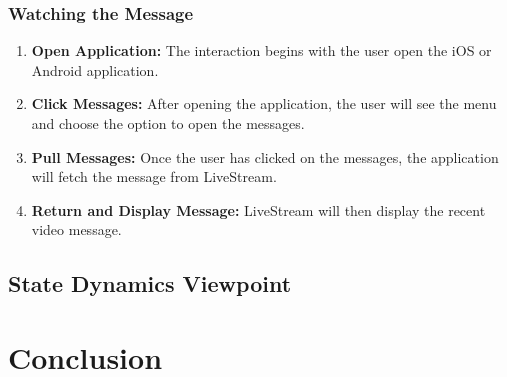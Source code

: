 \documentclass[letterpaper,10pt,draftclsnofoot,onecolumn,titlepage]{IEEEtran}
\begin{document}
			\subsubsection{Watching the Message}
				\begin{enumerate}
					\item \textbf{Open Application:} The interaction begins with the user open the iOS or Android application. 
					\item \textbf{Click Messages:} After opening the application, the user will see the menu and choose the option to open the messages. 
					\item \textbf{Pull Messages:} Once the user has clicked on the messages, the application will fetch the message from LiveStream.
					\item \textbf{Return and Display Message:} LiveStream will then display the recent video message. 
				\end{enumerate}


		\subsection{State Dynamics Viewpoint}


	\section{Conclusion}
\end{document}
